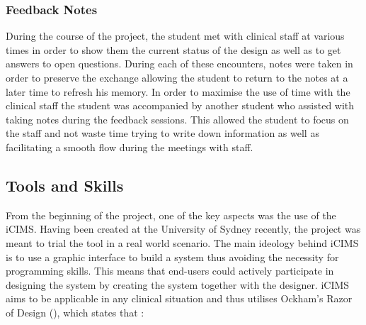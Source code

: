 \subsubsection{Feedback Notes}
During the course of the project, the student met with clinical staff at various times in order to show them the current status of the design as well as to get answers to open questions. During each of these encounters, notes were taken in order to preserve the exchange allowing the student to return to the notes at a  later time to refresh his memory. In order to maximise the use of time with the clinical staff the student was accompanied by another student who assisted with taking notes during the feedback sessions. This allowed the student to focus on the staff and not waste time trying to write down information as well as facilitating a smooth flow during the meetings with staff.

\newpage
\subsection{Tools and Skills}
From the beginning of the project, one of the key aspects was the use of the \gls{iCIMS}.  Having been created at the University of Sydney recently, the project was meant to trial the tool in a real world scenario. The main ideology behind iCIMS is to use a graphic interface to build a system thus avoiding the necessity for programming skills. This means that end-users could actively participate in designing the system by creating the system together with the designer. iCIMS aims to be applicable in any clinical situation and thus utilises Ockham's Razor of Design (\cite{Budd}), which states that :

